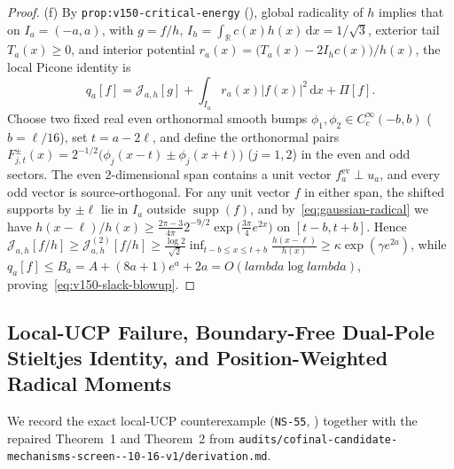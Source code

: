 \documentclass[11pt]{article}
\def\lambda{lambda}%
\theoremstyle{remark}
\newcommand{\dd}{\mathrm d}
\begin{document}
\begin{proof}
(f) By \texttt{prop:v150-critical-energy} (), global radicality of $h$ implies that on $I_a = (-a,a)$, with $g = f/h$, $I_h = \int_{\mathbb{R}} c(x)h(x)\,\dd x = 1/\sqrt{3}$, exterior tail $T_a(x) \ge 0$, and interior potential $r_a(x) = \bigl(T_a(x) - 2I_h c(x)\bigr)/h(x)$, the local Picone identity is
\begin{equation}\label{eq:v150-critical-picone}
  q_a[f] = \mathcal{J}_{a,h}[g] + \int_{I_a} r_a(x)|f(x)|^2\,\dd x + \Pi[f].
\end{equation}
Choose two fixed real even orthonormal smooth bumps $\phi_1, \phi_2 \in C_c^\infty(-b,b)$ ($b = \ell/16$), set $t = a - 2\ell$, and define the orthonormal pairs $F_{j,t}^{\pm}(x) = 2^{-1/2}\bigl(\phi_j(x-t) \pm \phi_j(x+t)\bigr)$ ($j=1,2$) in the even and odd sectors. The even $2$-dimensional span contains a unit vector $f_a^{\mathrm{ev}} \perp u_a$, and every odd vector is source-orthogonal. For any unit vector $f$ in either span, the shifted supports by $\pm\ell$ lie in $I_a$ outside $\operatorname{supp}(f)$, and by~\eqref{eq:gaussian-radical} we have $h(x-\ell)/h(x) \ge \frac{2\pi-3}{4\pi}2^{-9/2}\exp\bigl(\frac{3\pi}{4}e^{2x}\bigr)$ on $[t-b, t+b]$. Hence $\mathcal{J}_{a,h}[f/h] \ge \mathcal{J}_{a,h}^{(2)}[f/h] \ge \frac{\log 2}{\sqrt{2}}\inf_{t-b \le x \le t+b}\frac{h(x-\ell)}{h(x)} \ge \kappa\exp(\gamma e^{2a})$, while $q_a[f] \le B_a = A + (8a+1)e^a + 2a = O(\lambda\log\lambda)$, proving~\eqref{eq:v150-slack-blowup}.
\end{proof}

\subsection{Local-UCP Failure, Boundary-Free Dual-Pole Stieltjes Identity, and Position-Weighted Radical Moments}
We record the exact local-UCP counterexample (\texttt{NS-55}, ) together with the repaired Theorem~1 and Theorem~2 from \texttt{audits/cofinal-\allowbreak candidate-\allowbreak mechanisms-\allowbreak screen--10-16-v1/\allowbreak derivation.md}.
\end{document}

